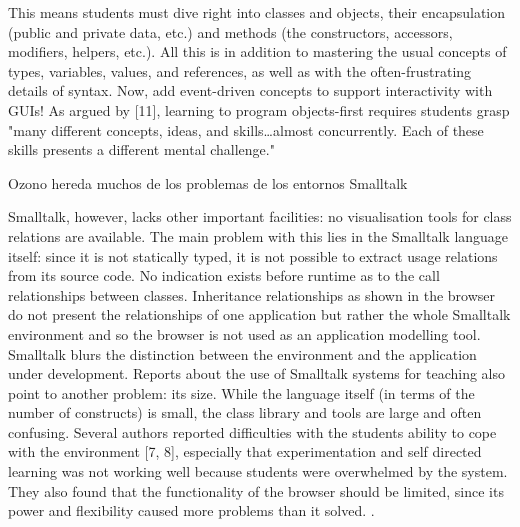 \documentclass[preprint,10pt]{sigplanconf}
\begin{document}




This means students must dive
right into classes and objects, their encapsulation (public
and private data, etc.) and methods (the constructors,
accessors, modifiers, helpers, etc.). All this is in addition to
mastering the usual concepts of types, variables, values, and
references, as well as with the often-frustrating details of
syntax. Now, add event-driven concepts to support
interactivity with GUIs! As argued by [11], learning to
program objects-first requires students grasp "many
different concepts, ideas, and skills…almost concurrently.
Each of these skills presents a different mental challenge." \cite{cooper_teaching_2003}


Ozono hereda muchos de los problemas de los entornos Smalltalk

Smalltalk, however, lacks other important facilities: no visualisation tools for class
relations are available. The main problem with this lies in the Smalltalk language
itself: since it is not statically typed, it is not possible to extract usage relations from
its source code. No indication exists before runtime as to the call relationships
between classes. Inheritance relationships as shown in the browser do not present
the relationships of one application but rather the whole Smalltalk environment and
so the browser is not used as an application modelling tool. Smalltalk blurs the
distinction between the environment and the application under development.
Reports about the use of Smalltalk systems for teaching also point to another
problem: its size. While the language itself (in terms of the number of constructs) is
small, the class library and tools are large and often confusing. Several authors
reported difficulties with the students ability to cope with the environment [7, 8],
especially that experimentation and self directed learning was not working well
because students were overwhelmed by the system. They also found that the
functionality of the browser should be limited, since its power and flexibility caused
more problems than it solved. \cite{kolling_problem_1999}.
\end{document}
